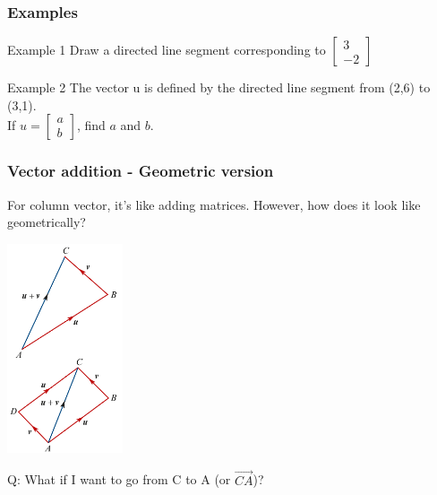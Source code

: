 \documentclass[
	11pt, %
]{beamer}
\begin{document}
\begin{frame}[t]
    \frametitle{Examples}
    \begin{block}{Example 1}
        Draw a directed line segment corresponding to $\begin{bmatrix}
            3 \\ -2
        \end{bmatrix}$
    \end{block}
    \begin{block}{Example 2}
        The vector u is defined by the directed line segment from (2,6) to (3,1).\\
        If $u = \begin{bmatrix}a \\ b\end{bmatrix}$, find $a$ and $b$.
    \end{block}
\end{frame}

\begin{frame}
    \frametitle{Vector addition - Geometric version}
    For column vector, it's like adding matrices. However, how does it look like geometrically?\\
    \begin{center}
        \includegraphics[width = 3.4cm]{Addtion_g.png}
    \end{center}
    Q: What if I want to go from C to A (or $\vec{CA}$)?
\end{frame}
\end{document}
